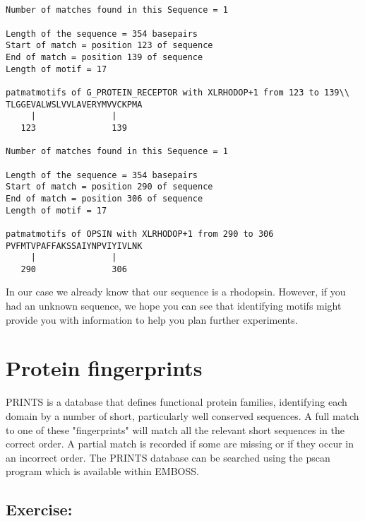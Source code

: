 \documentclass[12pt]{report}
\begin{document}
\unix{}\\
\\
\\
\\

\unix{}
\begin{verbatim}
Number of matches found in this Sequence = 1

Length of the sequence = 354 basepairs
Start of match = position 123 of sequence
End of match = position 139 of sequence
Length of motif = 17

patmatmotifs of G_PROTEIN_RECEPTOR with XLRHODOP+1 from 123 to 139\\
TLGGEVALWSLVVLAVERYMVVCKPMA
     |               |
   123               139

Number of matches found in this Sequence = 1

Length of the sequence = 354 basepairs
Start of match = position 290 of sequence
End of match = position 306 of sequence
Length of motif = 17

patmatmotifs of OPSIN with XLRHODOP+1 from 290 to 306
PVFMTVPAFFAKSSAIYNPVIYIVLNK
     |               |
   290               306
\end{verbatim}

In our case we already know that our sequence is a rhodopsin. However,
if you had an unknown sequence, we hope you can see that identifying
motifs might provide you with information to help you plan further
experiments.

\section{Protein fingerprints}
PRINTS is a database that defines functional protein families,
identifying each domain by a number of short, particularly well
conserved sequences. A full match to one of these "fingerprints" will
match all the relevant short sequences in the correct order. A partial
match is recorded if some are missing or if they occur in an incorrect
order. The PRINTS database can be searched using the pscan program
which is available within EMBOSS.

\subsection*{Exercise: }
\end{document}
